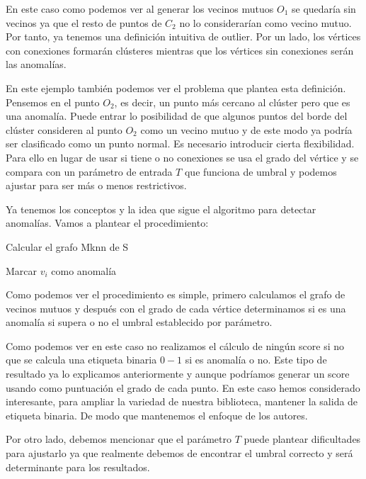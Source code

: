 En este caso como podemos ver al generar los vecinos mutuos $O_1$ se quedaría sin vecinos 
ya que el resto de puntos de $C_2$ no lo considerarían como vecino mutuo. Por tanto, ya tenemos 
una definición intuitiva de outlier. Por un lado, los vértices con conexiones formarán 
clústeres mientras que los vértices sin conexiones serán las anomalías. 

En este ejemplo también podemos ver el problema que plantea esta definición. Pensemos en el  
punto $O_2$, es decir, un punto más cercano al clúster pero que es una anomalía. 
Puede entrar lo posibilidad de que algunos puntos del borde del clúster consideren al  
punto $O_2$ como un vecino mutuo y de este modo ya podría ser clasificado como un punto 
normal. Es necesario introducir cierta flexibilidad. Para ello en lugar de usar si tiene o no  
conexiones se usa el grado del vértice y se compara con un parámetro de entrada $T$ que funciona 
de umbral y podemos ajustar para ser más o menos restrictivos.

Ya tenemos los conceptos y la idea que sigue el algoritmo para detectar anomalías.
Vamos a plantear el procedimiento:


\begin{codigo}
    \begin{algorithmic}[1]
    \State Calcular el grafo Mknn de S  
    \State \parbox[t]{305pt}{Marcar $v_i$ como anomalía}
    \EndIf  
    \EndFor
    \EndFunction 
    \end{algorithmic}
\end{codigo}


Como podemos ver el procedimiento es simple, primero calculamos el grafo
de vecinos mutuos y después con el grado de cada vértice determinamos si es
una anomalía si supera o no el umbral establecido por parámetro. 

  
Como podemos ver en este caso no realizamos el cálculo de ningún score si no que
se calcula una etiqueta binaria $0-1$ si es anomalía o no. Este tipo de resultado
ya lo explicamos anteriormente y aunque podríamos generar un score usando como
puntuación el grado de cada punto. En este caso hemos considerado interesante,
para ampliar la variedad de nuestra biblioteca, mantener la salida de etiqueta
binaria. De modo que mantenemos el enfoque de los autores.

  
Por otro lado, debemos mencionar que el parámetro $T$ puede plantear dificultades
para ajustarlo ya que realmente debemos de encontrar el umbral correcto y
será determinante para los resultados.


